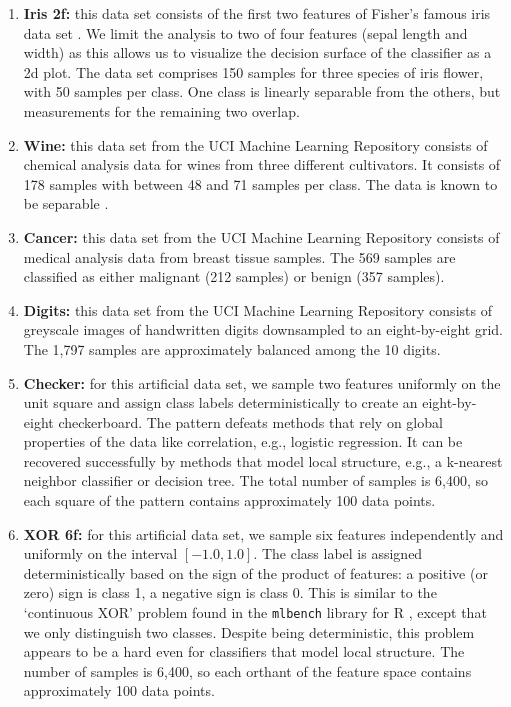 \begin{enumerate}
\item\textbf{Iris 2f:} this data set consists of the first two features of Fisher's famous iris data set \cite{Fisher_36}.
We limit the analysis to two of four features (sepal length and width) as this allows us to visualize the decision surface of the classifier as a 2d plot.
The data set comprises 150 samples for three species of iris flower, with 50 samples per class.
One class is linearly separable from the others, but measurements for the remaining two overlap.
%
\item\textbf{Wine:} this data set from the  UCI Machine Learning Repository \cite{Dua_19} consists of chemical analysis data for wines from three different cultivators.
It consists of 178 samples with between 48 and 71 samples per class.
The data is known to be separable \cite{Aeberhard_92}.
%
\item\textbf{Cancer:} this data set from the UCI Machine Learning Repository \cite{Dua_19} consists of medical analysis data from breast tissue samples.
The 569 samples are classified as either malignant (212 samples) or benign (357 samples).
%
\item\textbf{Digits:} this data set from the UCI Machine Learning Repository \cite{Dua_19} consists of greyscale images of handwritten digits downsampled to an eight-by-eight grid.
The 1,797 samples are approximately balanced among the 10 digits.
%
\item\textbf{Checker:} for this artificial data set, we sample two features uniformly on the unit square and assign class labels deterministically to create an eight-by-eight checkerboard.
The pattern defeats methods that rely on global properties of the data like correlation, e.g., logistic regression.
It can be recovered successfully by methods that model local structure, e.g., a k-nearest neighbor classifier or decision tree.
The total number of samples is 6,400, so each square of the pattern contains approximately 100 data points.
%
\item\textbf{XOR 6f:} for this artificial data set, we sample six features independently and uniformly on the interval $[-1.0, 1.0]$.
The class label is assigned deterministically based on the sign of the product of features: a positive (or zero) sign is class 1, a negative sign is class 0.
This is similar to the `continuous XOR' problem found in the \texttt{mlbench} library for R \cite{Leisch_21}, except that we only distinguish two classes.
Despite being deterministic, this problem appears to be a hard even for classifiers that model local structure.
The number of samples is 6,400, so each orthant of the feature space contains approximately 100 data points.
\end{enumerate}
